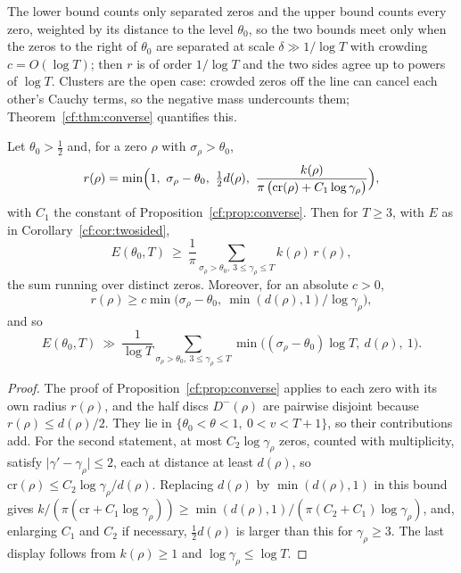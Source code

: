 The lower bound counts only separated zeros and the upper bound counts every zero, weighted by its distance to the level $\theta_0$, so the two bounds meet only when the zeros to the right of $\theta_0$ are separated at scale $\delta\gg1/\log T$ with crowding $c=O(\log T)$; then $r$ is of order $1/\log T$ and the two sides agree up to powers of $\log T$. Clusters are the open case: crowded zeros off the line can cancel each other's Cauchy terms, so the negative mass undercounts them; Theorem~\ref{cf:thm:converse} quantifies this.

\begin{theorem}\label{cf:thm:converse}
Let $\theta_0>\frac12$ and, for a zero $\rho$ with $\sigma_\rho>\theta_0$,
\[
r(\rho)=\min\Bigl(1,\ \sigma_\rho-\theta_0,\ \tfrac12d(\rho),\ \frac{k(\rho)}{\pi\,\bigl(\mathrm{cr}(\rho)+C_1\log\gamma_\rho\bigr)}\Bigr),
\]
with $C_1$ the constant of Proposition~\ref{cf:prop:converse}. Then for $T\ge3$, with $E$ as in Corollary~\ref{cf:cor:twosided},
\[
E(\theta_0,T)\ \ge\ \frac1\pi\sum_{\sigma_\rho>\theta_0,\ 3\le\gamma_\rho\le T}k(\rho)\,r(\rho),
\]
the sum running over distinct zeros. Moreover, for an absolute $c>0$,
\[
r(\rho)\ge c\min\bigl(\sigma_\rho-\theta_0,\ \min(d(\rho),1)/\log\gamma_\rho\bigr),
\]
and so
\[
E(\theta_0,T)\ \gg\ \frac1{\log T}\sum_{\sigma_\rho>\theta_0,\ 3\le\gamma_\rho\le T}\min\bigl((\sigma_\rho-\theta_0)\log T,\ d(\rho),\ 1\bigr).
\]
\end{theorem}

\begin{proof}
The proof of Proposition~\ref{cf:prop:converse} applies to each zero with its own radius $r(\rho)$, and the half discs $D^-(\rho)$ are pairwise disjoint because $r(\rho)\le d(\rho)/2$. They lie in $\{\theta_0<\theta<1,\ 0<v<T+1\}$, so their contributions add. For the second statement, at most $C_2\log\gamma_\rho$ zeros, counted with multiplicity, satisfy $\lvert\gamma'-\gamma_\rho\rvert\le2$, each at distance at least $d(\rho)$, so $\mathrm{cr}(\rho)\le C_2\log\gamma_\rho/d(\rho)$. Replacing $d(\rho)$ by $\min(d(\rho),1)$ in this bound gives $k/(\pi(\mathrm{cr}+C_1\log\gamma_\rho))\ge\min(d(\rho),1)/(\pi(C_2+C_1)\log\gamma_\rho)$, and, enlarging $C_1$ and $C_2$ if necessary, $\frac12d(\rho)$ is larger than this for $\gamma_\rho\ge3$. The last display follows from $k(\rho)\ge1$ and $\log\gamma_\rho\le\log T$.
\end{proof}

